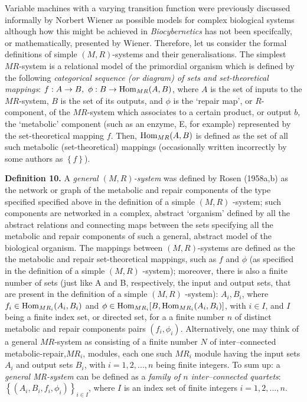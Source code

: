 \documentclass[12pt]{article}
\theoremstyle{plain}
\theoremstyle{definition}
\numberwithin{equation}{section}
\newcommand{\Hom}{{\rm Hom}}
\begin{document}
Variable machines with a varying transition function were previously discussed informally by Norbert Wiener as possible models for complex biological systems although how this might be achieved in \textit{Biocybernetics} has not been specifcally, or mathematically, presented by Wiener.
Therefore, let us consider the formal definitions of simple  $(M,R)$-systems and their generalisations.   The simplest $MR$-system is a relational model of the primordial organism which is defined by the following \emph{categorical sequence (or diagram) of sets and set-theoretical mappings}:
$f: A \rightarrow B, ~\phi: B \rightarrow \Hom_{MR}(A,B)$, where $A$ is the set of inputs to the
$MR$-system, $B$ is the set of its outputs, and $\phi$ is the `repair map', or $R$-component, of the $MR$-system which associates to a certain product, or output $b$, the `metabolic' component (such as an enzyme, E, for example)
represented by the set-theoretical mapping $f$. Then, $\Hom_{MR}(A,B)$ is defined as the set of all such metabolic (set-theoretical) mappings (occasionally written incorrectly by some authors as $\left\{f\right\}$).

\textbf{Definition 10.}  A \emph{general $(M,R)$-system} was defined by Rosen (1958a,b) as the network or graph of the metabolic and repair components of the type specified specified above in the definition of a simple  $(M,R)$ -system; such components are networked in a complex, abstract `organism' defined by all the abstract relations and connecting maps between the sets specifying all the metabolic and repair components of such a general, abstract model of the biological organism. The mappings between $(M,R)$-systems are defined as the the metabolic and repair set-theoretical mappings, such as $f$ and $\phi$ (as specified in the definition of a simple  $(M,R)$ -system); moreover, there is also a finite number of sets (just like A and B, respectively, the input and output sets, that are present in the definition of a simple  $(M,R)$ -system): $A_i, B_i$, where $f_i \in \Hom_{MR_i}(A_i,B_i)$ and
$\phi \in \Hom_{MR_i}[B, \Hom_{MR_i}(A_i,B_i)]$, with $i \in I$, and $I$ being a finite index set, or directed set, for a a finite number $n$ of distinct metabolic and repair components pairs 
 $(f_i,\phi_i)$. Alternatively, one may think of a general $MR$-system as consisting of a finite number $N$ of inter--connected metabolic-repair,$MR_i$, modules, each one such $MR_i$ module  having the input sets $A_i$ and output sets $B_i$, with $i=1, 2, ..., n$ being finite integers. To sum up:
a \emph{general MR-system} can be defined as a \emph{family of $n$ inter--connected quartets}:
$\left\{(A_i, B_i, f_i, \phi_i)\right\}_{i \in I}$, where $I$ is an index set of finite integers $i=1, 2, ..., n$.
\end{document}
